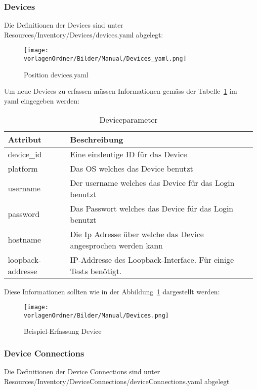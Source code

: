 \documentclass[]{subfiles}
\begin{document}
	\subsubsection{Devices}
		Die Definitionen der Devices sind unter Resources/Inventory/Devices/devices.yaml abgelegt:

		\begin{figure}[h!]
			\begin{center}
				\texttt{[image: \\vorlagenOrdner/Bilder/Manual/Devices\_yaml.png]}
				\caption{Position devices.yaml}
			\end{center}
		\end{figure}

		Um neue Devices zu erfassen müssen Informationen gemäss der Tabelle~\ref{table:Deviceparameter} im yaml eingegeben werden:\\
		\begin{table}[h!]
			\begin{tabularx}{\textwidth}{lX}
			\toprule
			Attribut & Beschreibung \\
			\midrule
			device\_id & Eine eindeutige ID für das Device \\
			platform & Das OS welches das Device benutzt \\
			username & Der username welches das Device für das Login benutzt\\
			password & Das Passwort welches das Device für das Login benutzt\\
			hostname & Die Ip Adresse über welche das Device angesprochen werden kann\\
			loopback-addresse & IP-Addresse des Loopback-Interface. Für einige Tests benötigt.\\
			\midrule
			\end{tabularx}
			\caption{Deviceparameter}
			\label{table:Deviceparameter}
		\end{table}
		
		Diese Informationen sollten wie in der Abbildung~\ref{fig:DeviceErfassung} dargestellt werden: 

		\begin{figure}[h!]
			\begin{center}
				\texttt{[image: \\vorlagenOrdner/Bilder/Manual/Devices.png]}
				\caption{Beispiel-Erfassung Device}
				\label{fig:DeviceErfassung}
			\end{center}
		\end{figure}

	\newpage

	\subsubsection{Device Connections}
		Die Definitionen der Device Connections sind unter 
		Resources/Inventory/DeviceConnections/deviceConnections.yaml abgelegt
\end{document}
